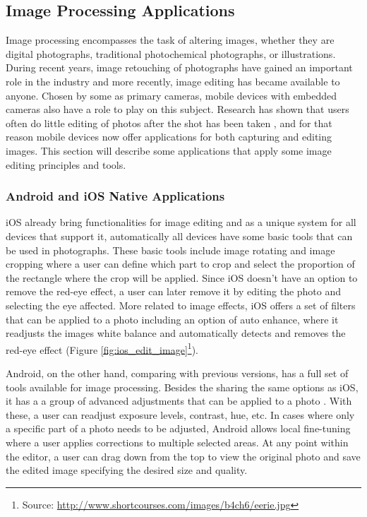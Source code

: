 \subsection{Image Processing Applications}

Image processing encompasses the task of altering images, whether they are digital photographs, traditional photochemical photographs, or illustrations. During recent years, image retouching of photographs have gained an important role in the industry and more recently, image editing has became available to anyone. Chosen by some as primary cameras, mobile devices with embedded cameras also have a role to play on this subject. Research has shown that users often do little editing of photos after the shot has been taken \cite{brewster2012rethinking}, and for that reason mobile devices now offer applications for both capturing and editing images. This section will describe some applications that apply some image editing principles and tools.
 
\subsubsection{Android and iOS Native Applications}

iOS already bring functionalities for image editing and as a unique system for all devices that support it, automatically all devices have some basic tools that can be used in photographs.
These basic tools include image rotating and image cropping where a user can define which part to crop and select the proportion of the rectangle where the crop will be applied.
Since iOS doesn't have an option to remove the red-eye effect, a user can later remove it by editing the photo and selecting the eye affected. More related to image effects, iOS offers a set of filters that can be applied to a photo including an option of auto enhance, where it readjusts the images white balance and automatically detects and removes the red-eye effect (Figure \ref{fig:ios_edit_image}\footnote{Source: \url{http://www.shortcourses.com/images/b4ch6/eerie.jpg}}).

Android, on the other hand, comparing with previous versions, has a full set of tools available for image processing. Besides the sharing the same options as iOS, it has a a group of advanced adjustments that can be applied to a photo \cite{Sharon}. With these, a user can readjust exposure levels, contrast, hue, etc. In cases where only a specific part of a photo needs to be adjusted, Android allows local fine-tuning where a user applies corrections to multiple selected areas. At any point within the editor, a user can drag down from the top to view the original photo and save the edited image specifying the desired size and quality.

